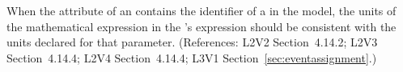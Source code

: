 When the  attribute of an \EventAssignment
contains the identifier of a \Parameter in the model, the
units of the mathematical expression in the
\EventAssignment's  expression should be
consistent with the units declared for that parameter.
(References: L2V2 Section~4.14.2; L2V3 Section~4.14.4; 
L2V4 Section~4.14.4; L3V1 Section~\ref{sec:eventassignment}.)
